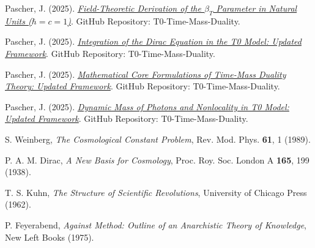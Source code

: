 \documentclass[12pt,a4paper]{article}
\begin{document}
	\begin{thebibliography}{99}
		
		Pascher, J. (2025). \href{https://github.com/jpascher/T0-Time-Mass-Duality/blob/main/2/pdf/DerivationVonBetaEn.pdf}{\textit{Field-Theoretic Derivation of the $\beta_T$ Parameter in Natural Units ($\hbar = c = 1$)}}. GitHub Repository: T0-Time-Mass-Duality.
		
		Pascher, J. (2025). \href{https://github.com/jpascher/T0-Time-Mass-Duality/blob/main/2/pdf/diracEn.pdf}{\textit{Integration of the Dirac Equation in the T0 Model: Updated Framework}}. GitHub Repository: T0-Time-Mass-Duality.
		
		Pascher, J. (2025). \href{https://github.com/jpascher/T0-Time-Mass-Duality/tree/main/2/pdf/MathZeitMasseLagrangeEn.pdf}{\textit{Mathematical Core Formulations of Time-Mass Duality Theory: Updated Framework}}. GitHub Repository: T0-Time-Mass-Duality.
		
		Pascher, J. (2025). \href{https://github.com/jpascher/T0-Time-Mass-Duality/blob/main/2/pdf/DynMassePhotonenNichtlokalEn.pdf}{\textit{Dynamic Mass of Photons and Nonlocality in T0 Model: Updated Framework}}. GitHub Repository: T0-Time-Mass-Duality.
		
		
		S. Weinberg, \textit{The Cosmological Constant Problem}, Rev. Mod. Phys. \textbf{61}, 1 (1989).
		
		P. A. M. Dirac, \textit{A New Basis for Cosmology}, Proc. Roy. Soc. London A \textbf{165}, 199 (1938).
		
		T. S. Kuhn, \textit{The Structure of Scientific Revolutions}, University of Chicago Press (1962).
		
		P. Feyerabend, \textit{Against Method: Outline of an Anarchistic Theory of Knowledge}, New Left Books (1975).
		
	\end{thebibliography}
	
\end{document}
